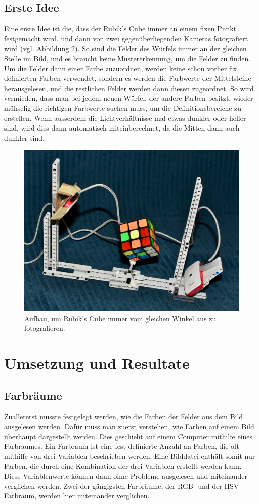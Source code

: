 \documentclass[a4paper, 12pt]{article}
\begin{document}
\subsection{Erste Idee}
Eine erste Idee ist die, dass der Rubik's Cube immer an einem fixen Punkt festgemacht wird, und dann von zwei gegenüberliegenden Kameras fotografiert wird (vgl. Abbildung 2). So sind die Felder des Würfels immer an der gleichen Stelle im Bild, und es braucht keine Mustererkennung, um die Felder zu finden. Um die Felder dann einer Farbe zuzuordnen, werden keine schon vorher fix definierten Farben verwendet, sondern es werden die Farbwerte der Mittelsteine herausgelesen, und die restlichen Felder werden dann diesen zugeordnet. So wird vermieden, dass man bei jedem neuen Würfel, der andere Farben besitzt, wieder mühselig die richtigen Farbwerte suchen muss, um die Definitionsbereiche zu erstellen. Wenn ausserdem die Lichtverhältnisse  mal etwas dunkler oder heller sind, wird dies dann automatisch miteinberechnet, da die Mitten dann auch dunkler sind. 
\begin{figure}[H]
\includegraphics[scale=0.25]{Aufbau_Bild}
\caption{Aufbau, um Rubik's Cube immer vom gleichen Winkel aus zu fotografieren.}
\end{figure}
\newpage
\section{Umsetzung und Resultate}
\subsection{Farbräume}
Zuallererst musste festgelegt werden, wie die Farben der Felder aus dem Bild ausgelesen werden. Dafür muss man zuerst verstehen, wie Farben auf einem Bild überhaupt dargestellt werden. Dies geschieht auf einem Computer mithilfe eines Farbraumes. Ein Farbraum ist eine fest definierte Anzahl an Farben, die oft mithilfe von drei Variablen beschrieben werden. Eine Bilddatei enthält somit nur Farben, die durch eine Kombination der drei Variablen erstellt werden kann. \cite{Farbraum} Diese Variablenwerte können dann ohne Probleme ausgelesen und miteinander verglichen werden. Zwei der gängigsten Farbräume, der RGB- und der HSV-Farbraum, werden hier miteinander verglichen. 
\end{document}
